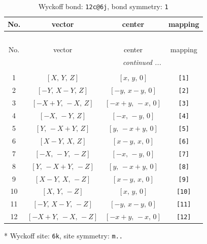 \documentclass[fleqn,8pt]{jsarticle}
\begin{document}
\begin{longtable}{cccc}
\caption{Wyckoff bond: {\tt 12c@6j}, bond symmetry: {\tt 1}}
 \\
 \hline \hline
No. & vector & center & mapping \\ \hline \endfirsthead

\multicolumn{3}{l}{\tablename\ \thetable{}} \\
 \hline \hline
No. & vector & center & mapping \\ \hline \endhead

 \hline \hline
\multicolumn{3}{r}{\footnotesize\it continued ...} \\ \endfoot

 \hline \hline
\multicolumn{3}{r}{} \\ \endlastfoot

1 & $\left[ X,\, Y,\, Z \right]$ & $\left[ x,\, y,\, 0 \right]$ & {\tt [1]} \\ \hline
2 & $\left[ - Y,\, X - Y,\, Z \right]$ & $\left[ - y,\, x - y,\, 0 \right]$ & {\tt [2]} \\ \hline
3 & $\left[ - X + Y,\, - X,\, Z \right]$ & $\left[ - x + y,\, - x,\, 0 \right]$ & {\tt [3]} \\ \hline
4 & $\left[ - X,\, - Y,\, Z \right]$ & $\left[ - x,\, - y,\, 0 \right]$ & {\tt [4]} \\ \hline
5 & $\left[ Y,\, - X + Y,\, Z \right]$ & $\left[ y,\, - x + y,\, 0 \right]$ & {\tt [5]} \\ \hline
6 & $\left[ X - Y,\, X,\, Z \right]$ & $\left[ x - y,\, x,\, 0 \right]$ & {\tt [6]} \\ \hline
7 & $\left[ - X,\, - Y,\, - Z \right]$ & $\left[ - x,\, - y,\, 0 \right]$ & {\tt [7]} \\ \hline
8 & $\left[ Y,\, - X + Y,\, - Z \right]$ & $\left[ y,\, - x + y,\, 0 \right]$ & {\tt [8]} \\ \hline
9 & $\left[ X - Y,\, X,\, - Z \right]$ & $\left[ x - y,\, x,\, 0 \right]$ & {\tt [9]} \\ \hline
10 & $\left[ X,\, Y,\, - Z \right]$ & $\left[ x,\, y,\, 0 \right]$ & {\tt [10]} \\ \hline
11 & $\left[ - Y,\, X - Y,\, - Z \right]$ & $\left[ - y,\, x - y,\, 0 \right]$ & {\tt [11]} \\ \hline
12 & $\left[ - X + Y,\, - X,\, - Z \right]$ & $\left[ - x + y,\, - x,\, 0 \right]$ & {\tt [12]} \\
\end{longtable}
* Wyckoff site: {\tt 6k}, site symmetry: {\tt m..}
\renewcommand{\arraystretch}{1.2}
\end{document}
